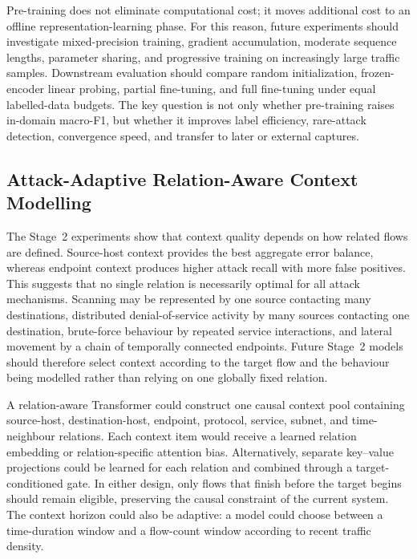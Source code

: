 Pre-training does not eliminate computational cost; it moves additional cost to
an offline representation-learning phase. For this reason, future experiments
should investigate mixed-precision training, gradient accumulation, moderate
sequence lengths, parameter sharing, and progressive training on increasingly
large traffic samples. Downstream evaluation should compare random
initialization, frozen-encoder linear probing, partial fine-tuning, and full
fine-tuning under equal labelled-data budgets. The key question is not only
whether pre-training raises in-domain macro-F1, but whether it improves label
efficiency, rare-attack detection, convergence speed, and transfer to later or
external captures.

\subsection{Attack-Adaptive Relation-Aware Context Modelling}
\label{subsubsec:future_relation_aware_context}

The Stage~2 experiments show that context quality depends on how related flows
are defined. Source-host context provides the best aggregate error balance,
whereas endpoint context produces higher attack recall with more false
positives. This suggests that no single relation is necessarily optimal for all
attack mechanisms. Scanning may be represented by one source contacting many
destinations, distributed denial-of-service activity by many sources contacting
one destination, brute-force behaviour by repeated service interactions, and
lateral movement by a chain of temporally connected endpoints. Future Stage~2
models should therefore select context according to the target flow and the
behaviour being modelled rather than relying on one globally fixed relation.

A relation-aware Transformer could construct one causal context pool containing
source-host, destination-host, endpoint, protocol, service, subnet, and
time-neighbour relations. Each context item would receive a learned relation
embedding or relation-specific attention bias. Alternatively, separate
key--value projections could be learned for each relation and combined through
a target-conditioned gate. In either design, only flows that finish before the
target begins should remain eligible, preserving the causal constraint of the
current system. The context horizon could also be adaptive: a model could choose
between a time-duration window and a flow-count window according to recent
traffic density.

